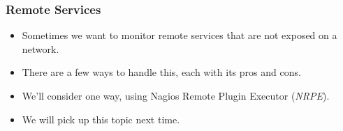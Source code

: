 \documentclass[10pt]{beamer}
\begin{document}
\begin{frame}
  \frametitle{Remote Services}


\begin{itemize}
  \item Sometimes we want to monitor remote services that are not exposed on a network.
  \item There are a few ways to handle this, each with its pros and cons.
  \item We'll consider one way, using Nagios Remote Plugin Executor (\emph{NRPE}).
  \item We will pick up this topic next time.
\end{itemize}

\end{frame}
\end{document}
